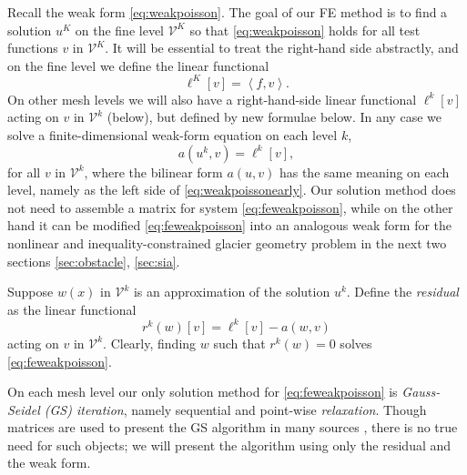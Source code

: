 \documentclass[letterpaper,final,12pt,reqno]{amsart}
\newcommand{\ip}[2]{\left<#1,#2\right>}
\begin{document}
Recall the weak form \eqref{eq:weakpoisson}.  The goal of our FE method is to find a solution $u^K$ on the fine level $\mathcal{V}^K$ so that \eqref{eq:weakpoisson} holds for all test functions $v$ in $\mathcal{V}^K$.  It will be essential to treat the right-hand side abstractly, and on the fine level we define the linear functional
\begin{equation}
  \ell^K[v] = \ip{f}{v}.  \label{eq:rhsfine}
\end{equation}
On other mesh levels we will also have a right-hand-side linear functional $\ell^k[v]$ acting on $v$ in $\mathcal{V}^k$ (below), but defined by new formulae below.  In any case we solve a finite-dimensional weak-form equation on each level $k$,
\begin{equation}
  a(u^k,v) = \ell^k[v],  \label{eq:feweakpoisson}
\end{equation}
for all $v$ in $\mathcal{V}^k$, where the bilinear form $a(u,v)$ has the same meaning on each level, namely as the left side of \eqref{eq:weakpoissonearly}.  Our solution method does not need to assemble a matrix for system \eqref{eq:feweakpoisson}, while on the other hand it can be modified \eqref{eq:feweakpoisson} into an analogous weak form for the nonlinear and inequality-constrained glacier geometry problem in the next two sections \ref{sec:obstacle}, \ref{sec:sia}.

Suppose $w(x)$ in $\mathcal{V}^k$ is an approximation of the solution $u^k$.  Define the \emph{residual} as the linear functional
\begin{equation}
  r^k(w)[v] = \ell^k[v] - a(w,v)  \label{eq:residual}
\end{equation}
acting on $v$ in $\mathcal{V}^k$.  Clearly, finding $w$ such that $r^k(w)=0$ solves \eqref{eq:feweakpoisson}.

On each mesh level our only solution method for \eqref{eq:feweakpoisson} is \emph{Gauss-Seidel (GS) iteration}, namely sequential and point-wise \emph{relaxation}.  Though matrices are used to present the GS algorithm in many sources \cite[for example]{Bueler2021,Greenbaum1997}, there is no true need for such objects; we will present the algorithm using only the residual and the weak form.
\end{document}
